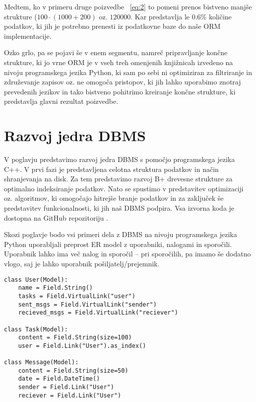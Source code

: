 \documentclass[a4paper,12pt,openright]{book}
\begin{document}
    Medtem, ko v primeru druge poizvedbe ~\eqref{eq:2} to pomeni prenos bistveno manjše strukture ($100 \cdot (1000 + 200)$ oz. $\num{120000}$. Kar predstavlja le $0.6\%$ količine podatkov, ki jih je potrebno prenesti iz podatkovne baze do naše ORM implementacije.

    Ozko grlo, pa se pojavi še v enem segmentu, namreč pripravljanje končne strukture, ki jo vrne ORM je v vseh treh omenjenih knjižnicah izvedeno na nivoju programskega jezika Python, ki sam po sebi ni optimiziran za filtriranje in združevanje zapisov oz. ne omogoča pristopov, ki jih lahko uporabimo znotraj prevedenih jezikov in tako bistveno pohitrimo kreiranje končne strukture, ki predstavlja glavni rezultat poizvedbe.

\chapter{Razvoj jedra DBMS}
\label{ch0}
    V poglavju predstavimo razvoj jedra DBMS s pomočjo programskega jezika C++. V prvi fazi je predstavljena celotna struktura podatkov in način shranjevanja na disk. Za tem predstavimo razvoj B+ drevesne strukture za optimalno indeksiranje podatkov. Nato se spustimo v predstavitev optimizaciji oz. algoritmov, ki omogočajo hitrejše branje podatkov in za zaključek še predstavitev funkcionalnosti, ki jih naš DBMS podpira.
    \newline
    \newline
    \noindent
    Vsa izvorna koda je dostopna na GitHub repozitoriju \cite{GRAPHENIX_GITHUB}.

    \newpage
    \noindent
    Skozi poglavje bodo vsi primeri dela z DBMS na nivoju programskega jezika Python uporabljali preprost ER model z uporabniki, nalogami in sporočili. Uporabnik lahko ima več nalog in sporočil – pri sporočilih, pa imamo še dodatno vlogo, saj je lahko uporabnik pošiljatelj/prejemnik.
\begin{verbatim}
class User(Model):
    name = Field.String()
    tasks = Field.VirtualLink("user")
    sent_msgs = Field.VirtualLink("sender")
    recieved_msgs = Field.VirtualLink("reciever")

class Task(Model):
    content = Field.String(size=100)
    user = Field.Link("User").as_index()

class Message(Model):
    content = Field.String(size=50)
    date = Field.DateTime()
    sender = Field.Link("User")
    reciever = Field.Link("User")
\end{verbatim}
    
\end{document}
